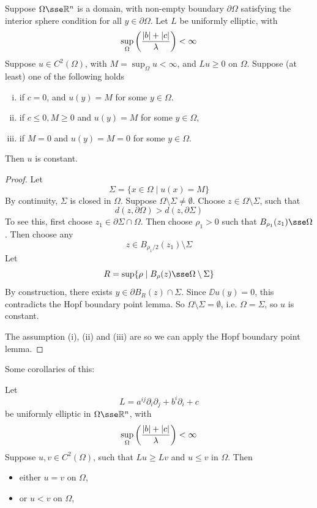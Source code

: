 \documentclass{article}
\begin{document}
\begin{theorem}
     Suppose \(\Omega \sse \R^n\) is a domain, with non-empty boundary \(\partial \Omega\) satisfying the interior sphere condition for all \(y \in \partial\Omega\). Let \(L\) be uniformly elliptic, with
    \[\sup_\Omega \left(\frac{\abs{b} + \abs{c}}{\lambda}\right) < \infty\]
    Suppose \(u \in C^2(\Omega)\), with \(M = \sup_\Omega u < \infty\), and \(Lu \ge 0\) on \(\Omega\). Suppose (at least) one of the following holds
    \begin{enumerate}[(i)]
        \item if \(c = 0\), and \(u(y) = M\) for some \(y \in \Omega\).
        \item if \(c \le 0, M \ge 0\) and \(u(y) = M\) for some \(y \in \Omega\),
        \item if \(M = 0\) and \(u(y) = M = 0\) for some \(y \in \Omega\).
    \end{enumerate}
    Then \(u\) is constant.
\end{theorem}

\begin{proof}
    Let
    \[\Sigma = \{x \in \Omega \mid u(x) = M\}\]
    By continuity, \(\Sigma\) is closed in \(\Omega\). Suppose \(\Omega \setminus \Sigma \ne \emptyset\). Choose \(z \in \Omega \setminus \Sigma\), such that
    \[d(z, \partial\Omega) > d(z, \partial\Sigma)\]
    To see this, first choose \(z_1 \in \partial\Sigma \cap \Omega\). Then choose \(\rho_1 > 0\) such that \(B_{\rho_1}(z_1) \sse \Omega\). Then choose any
    \[z \in B_{\rho_1/2}(z_1) \setminus \Sigma\]
    Let
    \[R = \sup\{\rho \mid B_\rho(z) \sse \Omega \setminus \Sigma\}\]
    By construction, there exists \(y \in \partial B_R(z) \cap \Sigma\). Since \(\DD u(y) = 0\), this contradicts the Hopf boundary point lemma. So \(\Omega \setminus \Sigma = \emptyset\), i.e. \(\Omega = \Sigma\), so \(u\) is constant.

    The assumption (i), (ii) and (iii) are so we can apply the Hopf boundary point lemma.
\end{proof}

Some corollaries of this:

\begin{corollary}
    Let
    \[L = a^{ij}\partial_i\partial_j + b^i\partial_i + c\]
    be uniformly elliptic in \(\Omega \sse \R^n\), with
    \[\sup_{\Omega}\left(\frac{\abs{b} + \abs{c}}{\lambda}\right) < \infty\]
    Suppose \(u, v \in C^2(\Omega)\), such that \(Lu \ge Lv\) and \(u \le v\) in \(\Omega\). Then
    \begin{itemize}
        \item either \(u  =v\) on \(\Omega\),
        \item or \(u < v\) on \(\Omega\),
    \end{itemize}
\end{corollary}
\end{document}
